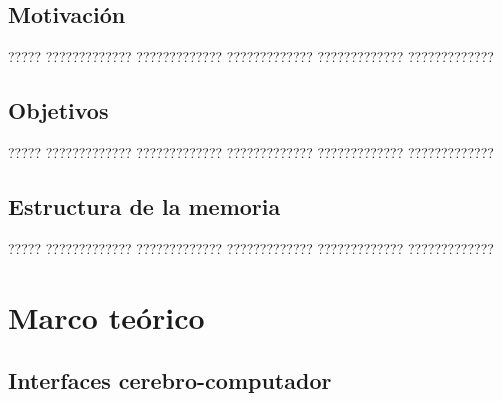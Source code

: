 \documentclass[11pt,spanish,listoffigures,listoftables]{tfgetsinf}
\begin{document}
\section{Motivación}

????? ????????????? ????????????? ????????????? ????????????? ????????????? 

\section{Objetivos}

????? ????????????? ????????????? ????????????? ????????????? ?????????????

\section{Estructura de la memoria}

????? ????????????? ????????????? ????????????? ????????????? ????????????? 





\chapter{Marco teórico}

\section{Interfaces cerebro-computador}

\end{document}
